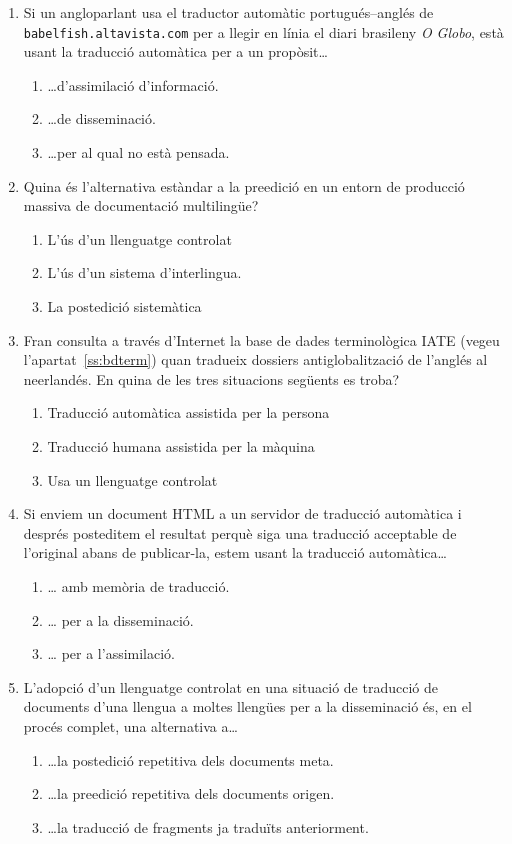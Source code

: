 \begin{enumerate}
\item Si un angloparlant usa el traductor automàtic portugués--anglés
  de \verb|babelfish.altavista.com| per a llegir en línia el diari
  brasileny \emph{O Globo}, està usant la traducció automàtica per a
  un propòsit\ldots
  \begin{enumerate}
  \item \ldots d'assimilació d'informació.
  \item \ldots de disseminació.
  \item \ldots per al qual no està pensada.
  \end{enumerate}

\item Quina és l'alternativa estàndar a la preedició en un entorn de
  producció massiva de documentació multilingüe?
  \begin{enumerate}
  \item L'ús d'un llenguatge controlat
  \item L'ús d'un sistema d'interlingua.
  \item La postedició sistemàtica
  \end{enumerate}

\item Fran consulta a través d'Internet la base de dades terminològica
  IATE (vegeu l'apartat~\ref{ss:bdterm}) quan tradueix dossiers
  antiglobalització de l'anglés al neerlandés. En quina de les tres
  situacions següents es troba?
  \begin{enumerate}
  \item Traducció automàtica assistida per la persona
  \item Traducció humana assistida per la màquina
  \item Usa un llenguatge controlat
\end{enumerate}

\item Si enviem un document HTML a un servidor de traducció automàtica
  i després posteditem el resultat perquè siga una traducció
  acceptable de l'original abans de publicar-la, estem usant la
  traducció automàtica{\ldots}   
  \begin{enumerate}
  \item {\ldots} amb memòria de traducció.
  \item {\ldots} per a la disseminació.
  \item {\ldots} per a l'assimilació.
  \end{enumerate}

\item L'adopció d'un llenguatge controlat en una situació de traducció
  de documents d'una llengua a moltes llengües per a la disseminació
  és, en el procés complet, una alternativa a{\ldots}
  \begin{enumerate}
  \item {\ldots}la postedició repetitiva dels documents meta.
  \item {\ldots}la preedició repetitiva dels documents origen.
  \item {\ldots}la traducció de fragments ja traduïts anteriorment.
  \end{enumerate}


\end{enumerate}
